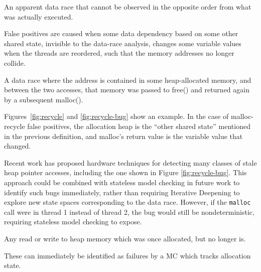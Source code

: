 \begin{definition}
	An apparent data race that cannot be observed in the opposite order from what was actually executed.
\end{definition}

False positives are caused when some data dependency based on some other shared state, invisible to the data-race analysis,
changes some variable values when the threads are reordered, such that the memory addresses no longer collide.

\begin{definition}
	A data race where the address is contained in some heap-allocated memory, and between the two accesses, that memory was passed to free() and returned again by a subsequent malloc().
\end{definition}

Figures~\ref{fig:recycle} and \ref{fig:recycle-bug} show an example.
In the case of malloc-recycle false positives, the allocation heap is the ``other shared state'' mentioned in the previous definition, and malloc's return value is the variable value that changed.

Recent work \cite{sparc-ssm} has proposed hardware techniques for detecting many classes of stale heap pointer accesses, including the one shown in Figure \ref{fig:recycle-bug}.
This approach could be combined with stateless model checking in future work to identify such bugs immediately,
rather than requiring Iterative Deepening to explore new state spaces corresponding to the data race.
However, if the {\tt malloc} call were in thread 1 instead of thread 2, the bug would still be nondeterministic, requiring stateless model checking to expose.

\begin{definition}
	Any read or write to heap memory which was once allocated, but no longer is.
\end{definition}

These can immediately be identified as failures by a MC which tracks allocation state.

